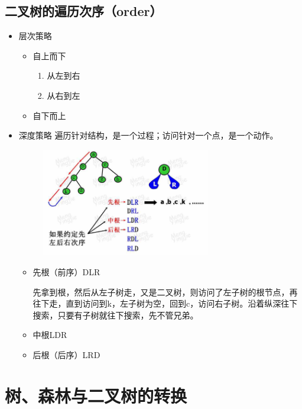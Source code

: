 \documentclass[AutoFakeBold]{LZUThesis2007}
\begin{document}
		\subsection{二叉树的遍历次序（order）}
			\begin{itemize}
				\item 层次策略
					\begin{itemize}
						\item 自上而下
							\begin{enumerate}
								\item 从左到右
								\item 从右到左
							\end{enumerate}
						\item 自下而上
					\end{itemize}
				\item 深度策略
				遍历针对结构，是一个过程；访问针对一个点，是一个动作。
				\begin{figure}[H]
				    \centering
				    \includegraphics[width=0.7\textwidth]{figures/7.2.png}
				    
				    \label{fig_install_texlive}
				\end{figure}
				\begin{itemize}
					\item 先根（前序）DLR

					先拿到根，然后从左子树走，又是二叉树，则访问了左子树的根节点，再往下走，直到访问到k，左子树为空，回到c，访问右子树。沿着纵深往下搜索，只要有子树就往下搜索，先不管兄弟。
					\item 中根LDR
					\item 后根（后序）LRD
				\end{itemize}

			\end{itemize}

	\section{树、森林与二叉树的转换}
\end{document}
